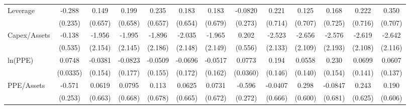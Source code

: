 {\begin{tabular}{l*{12}{c}}
Leverage            &      -0.288         &       0.149         &       0.199         &       0.235         &       0.183         &       0.183         &     -0.0820         &       0.221         &       0.125         &       0.168         &       0.222         &       0.350         \\
                    &     (0.235)         &     (0.657)         &     (0.658)         &     (0.657)         &     (0.654)         &     (0.679)         &     (0.273)         &     (0.714)         &     (0.707)         &     (0.725)         &     (0.716)         &     (0.707)         \\
Capex/Assets        &      -0.138         &      -1.956         &      -1.995         &      -1.896         &      -2.035         &      -1.965         &       0.202         &      -2.523         &      -2.656         &      -2.576         &      -2.619         &      -2.642         \\
                    &     (0.535)         &     (2.154)         &     (2.145)         &     (2.186)         &     (2.148)         &     (2.149)         &     (0.556)         &     (2.133)         &     (2.109)         &     (2.193)         &     (2.108)         &     (2.116)         \\
ln(PPE)             &      0.0748\sym{**} &     -0.0381         &     -0.0823         &     -0.0509         &     -0.0696         &     -0.0517         &      0.0773\sym{**} &       0.194         &      0.0558         &       0.230         &      0.0699         &      0.0607         \\
                    &    (0.0335)         &     (0.154)         &     (0.177)         &     (0.155)         &     (0.172)         &     (0.162)         &    (0.0360)         &     (0.146)         &     (0.140)         &     (0.154)         &     (0.141)         &     (0.137)         \\
PPE/Assets          &      -0.571\sym{**} &      0.0619         &      0.0795         &       0.113         &      0.0625         &      0.0731         &      -0.596\sym{**} &     -0.0407         &       0.298         &     -0.0847         &       0.243         &       0.190         \\
                    &     (0.253)         &     (0.663)         &     (0.668)         &     (0.678)         &     (0.665)         &     (0.672)         &     (0.272)         &     (0.666)         &     (0.600)         &     (0.681)         &     (0.625)         &     (0.606)         \\

\end{tabular}}
